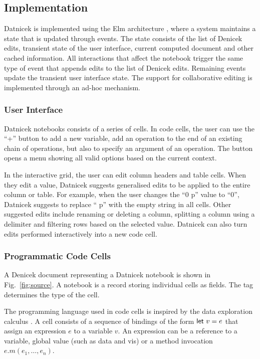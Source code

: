 \documentclass[sigconf]{acmart}
\newcommand{\ident}[1]{{\sffamily #1}}
\begin{document}
\subsection{Implementation}
Datnicek is implemented using the Elm architecture \cite{fowler-2020-mvu},
where a system maintains a state that is updated through events. The state consists
of the list of Denicek edits, transient state of the user interface, current computed document
and other cached information. All interactions that affect the notebook trigger
the same type of event that appends edits to the list of Denicek edits. Remaining events
update the transient user interface state. The support for collaborative editing is
implemented through an ad-hoc mechanism.

\subsubsection*{User Interface}
Datnicek notebooks consists of a series of cells. In code cells, the user can
use the ``+'' button to add a new variable, add an operation to the end of an existing chain
of operations, but also to specify an argument of an operation. The button opens
a menu showing all valid options based on the current context.

In the interactive grid, the user can edit column headers and table cells. When they edit
a value, Datnicek suggests generalised edits to be applied to the entire
column or table. For example, when the user changes the ``0 p'' value to ``0'', Datnicek
suggests to replace `` p'' with the empty string in all cells. Other suggested edits include renaming
or deleting a column, splitting a column using a delimiter and filtering rows based on the selected
value. Datnicek can also turn edits performed interactively into a new code cell.

\subsubsection*{Programmatic Code Cells}
A Denicek document representing a Datnicek notebook is shown in Fig.~\ref{fig:source}. A
notebook is a record storing individual cells as fields. The tag determines the type of the cell.

The programming language used in code cells is inspired by the data exploration calculus \cite{petricek-2020-live}.
A cell consists of a sequence of bindings of the form $\textnormal{\ident{let}}~v=e$ that assign
an expression $e$ to a variable $v$. An expression can be a reference to a variable,
global value (such as \ident{data} and \ident{vis}) or a method invocation $e.m(e_1, \ldots, e_n)$.
\end{document}
